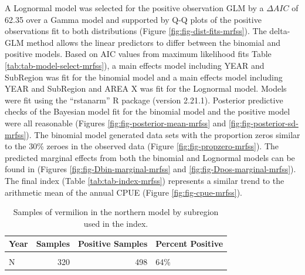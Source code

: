 \documentclass[
  english,
  a4paper,
]{article}
\begin{document}
A Lognormal model was
selected for the positive observation GLM by
a \(\Delta AIC\) of 62.35 over a Gamma model and supported by Q-Q plots of the positive observations fit to both distributions (Figure \ref{fig:fig-dist-fits-mrfss}). The delta-GLM
method allows the linear predictors to differ between the binomial and positive models.
Based on AIC values from maximum likelihood fits Table \ref{tab:tab-model-select-mrfss}),
a main effects model including
YEAR and SubRegion
was fit for the binomial model and a main
effects model including
YEAR and SubRegion and AREA X
was fit for the Lognormal model.
Models were fit using the ``rstanarm'' R package (version 2.21.1). Posterior predictive
checks of the Bayesian model fit for the binomial model and the positive model
were all reasonable (Figures \ref{fig:fig-posterior-mean-mrfss} and
\ref{fig:fig-posterior-sd-mrfss}). The binomial model generated data sets with the
proportion zeros similar to the
30\%
zeroes in the observed data (Figure \ref{fig:fig-propzero-mrfss}).
The predicted marginal effects from both the binomial and Lognormal models
can be found in (Figures \ref{fig:fig-Dbin-marginal-mrfss} and
\ref{fig:fig-Dpos-marginal-mrfss}). The final index (Table \ref{tab:tab-index-mrfss})
represents a similar trend to the arithmetic mean of the annual CPUE (Figure \ref{fig:fig-cpue-mrfss}).

\newpage

\begin{table}

\caption{\label{tab:tab-region-mrfss}Samples of vermilion in the northern model by subregion used in the index.}
\centering
\begin{tabular}[t]{lrrl}
\toprule
Year & Samples & Positive Samples & Percent Positive\\
\midrule
\cellcolor{gray!6}{C} & \cellcolor{gray!6}{442} & \cellcolor{gray!6}{585} & \cellcolor{gray!6}{76\%}\\
N & 320 & 498 & 64\%\\
\bottomrule
\end{tabular}
\end{table}
\end{document}
